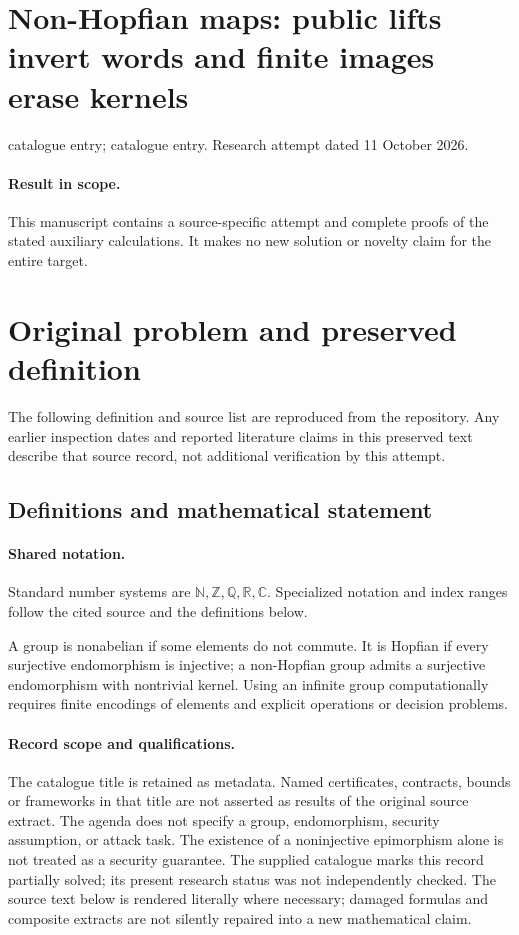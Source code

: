 \documentclass[11pt]{article}
\begin{document}
\section*{Non-Hopfian maps: public lifts invert words and finite images erase kernels}
\noindent catalogue entry; catalogue entry. Research attempt dated 11 October 2026.
\paragraph{Result in scope.}This manuscript contains a source-specific attempt and complete proofs of the stated auxiliary calculations. It makes no new solution or novelty claim for the entire target.
\section{Original problem and preserved definition}
The following definition and source list are reproduced from the repository. Any earlier inspection dates and reported literature claims in this preserved text describe that source record, not additional verification by this attempt.
\subsection{Definitions and mathematical statement}

\paragraph{Shared notation.}Standard number systems are $\mathbb N,\mathbb Z,\mathbb Q,\mathbb R,\mathbb C$. Specialized notation and index ranges follow the cited source and the definitions below.


A group is nonabelian if some elements do not commute. It is Hopfian if every surjective endomorphism is injective; a non-Hopfian group admits a surjective endomorphism with nontrivial kernel. Using an infinite group computationally requires finite encodings of elements and explicit operations or decision problems.
\paragraph{Record scope and qualifications.}
The catalogue title is retained as metadata. Named certificates, contracts, bounds or frameworks in that title are not asserted as results of the original source extract.
The agenda does not specify a group, endomorphism, security assumption, or attack task. The existence of a noninjective epimorphism alone is not treated as a security guarantee. The supplied catalogue marks this record partially solved; its present research status was not independently checked.
The source text below is rendered literally where necessary; damaged formulas and composite extracts are not silently repaired into a new mathematical claim.
\end{document}
